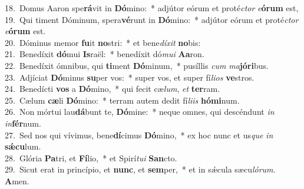 {18.~}Domus Aaron spe\textbf{rá}vit in \textbf{Dó}mino:~* adjútor eórum et proté\textit{ctor} \textit{e}\textbf{ó}\textbf{rum} est,\\
{19.~}Qui timent Dóminum, spera\textbf{vé}runt in \textbf{Dó}mino:~* adjútor eórum et proté\textit{ctor} \textit{e}\textbf{ó}\textbf{rum} est.\\
{20.~}Dóminus memor \textbf{fu}it \textbf{no}stri:~* et bene\textit{dí}\textit{xit} \textbf{no}bis:\\
{21.~}Benedíxit \textbf{dó}mui \textbf{Is}raël:~* benedíxit dó\textit{mu}\textit{i} \textbf{A}\textbf{a}ron.\\
{22.~}Benedíxit ómnibus, qui \textbf{ti}ment \textbf{Dó}minum,~* pusíllis \textit{cum} \textit{ma}\textbf{jó}\textbf{ri}bus.\\
{23.~}Adjíciat \textbf{Dó}minus \textbf{su}per vos:~* super vos, et super fí\textit{li}\textit{os} \textbf{ve}stros.\\
{24.~}Benedícti \textbf{vos} a \textbf{Dó}mino,~* qui fecit cæ\textit{lum}, \textit{et} \textbf{ter}ram.\\
{25.~}Cælum \textbf{cæ}li \textbf{Dó}mino:~* terram autem dedit fí\textit{li}\textit{is} \textbf{hó}\textbf{mi}num.\\
{26.~}Non mórtui lau\textbf{dá}bunt te, \textbf{Dó}mine:~* neque omnes, qui descéndunt \textit{in} \textit{in}\textbf{fér}num.\\
{27.~}Sed nos qui vívimus, bene\textbf{dí}cimus \textbf{Dó}mino,~* ex hoc nunc et us\textit{que} \textit{in} \textbf{sǽ}\textbf{cu}lum.\\
{28.~}Glória \textbf{Pa}tri, et \textbf{Fí}lio,~* et Spirí\textit{tu}\textit{i} \textbf{San}cto.\\
{29.~}Sicut erat in princípio, et \textbf{nunc}, et \textbf{sem}per,~* et in sǽcula sæcu\textit{ló}\textit{rum}. \textbf{A}men.\\
